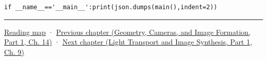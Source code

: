 \begin{verbatim}
if __name__=='__main__':print(json.dumps(main(),indent=2))
\end{verbatim}

\begin{center}\rule{0.5\linewidth}{0.5pt}\end{center}

\hyperref[volume-reading-map]{Reading map} · \href{../03-Geometry-Cameras-and-Image-Formation-P01/main.pdf\#04-visual-computing-ii-ch033-projection-scale-and-incidence-geometry}{Previous chapter (Geometry, Cameras, and Image Formation, Part 1, Ch. 14)} · \href{../04-Light-Transport-and-Image-Synthesis-P01/main.pdf\#04-visual-computing-ii-ch035-a-complete-renderer-as-an-executable-forward-model}{Next chapter (Light Transport and Image Synthesis, Part 1, Ch. 9)}
